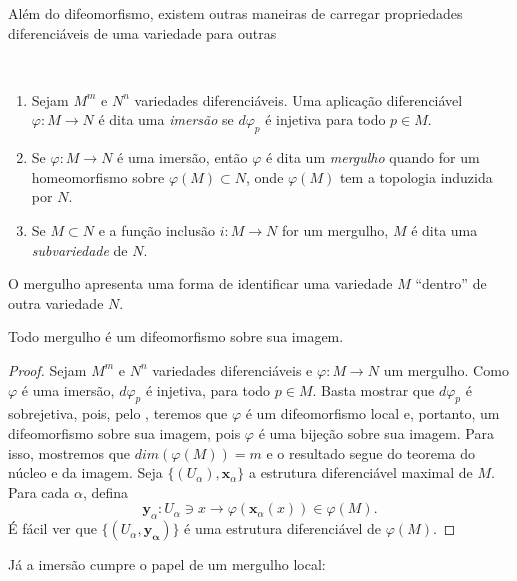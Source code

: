 	Além do difeomorfismo, existem outras maneiras de carregar propriedades diferenciáveis de uma variedade para outras
	\begin{definition}
		\label{def:imersao-mergulho}
		$ $
		\begin{enumerate}[label=(\roman*)]
			\item Sejam $M^m$ e $N^{n}$ variedades diferenciáveis. Uma aplicação diferenciável $\varphi:M\to N$ é dita uma \emph{imersão} se $d\varphi_{p}$ é injetiva para todo $p \in M$.
			\item Se $\varphi:M\to N$  é uma imersão, então $\varphi$ é dita um \emph{mergulho} quando for um homeomorfismo sobre $\varphi(M)\subset N$, onde $\varphi(M)$ tem a topologia induzida por $N$.
			\item Se $M \subset N$ e a função inclusão $i:M\to N$ for um mergulho, $M$ é dita uma \emph{subvariedade} de $N$.
		\end{enumerate}
	\end{definition}
	O mergulho apresenta uma forma de identificar uma variedade $M$ ``dentro'' de outra variedade $N$.
	\begin{proposition}
		\label{prop:imersao-mergulho}
		Todo mergulho é um difeomorfismo sobre sua imagem.
		\begin{proof}

			Sejam $M^{m}$ e $N^{n}$ variedades diferenciáveis e $\varphi:M\to N$ um mergulho.
			Como $\varphi$ é uma imersão, $d\varphi_{p}$ é injetiva, para todo $p \in M$.
			Basta mostrar que $d\varphi_{p}$ é sobrejetiva, pois, pelo , teremos que $\varphi$ é um difeomorfismo local e, portanto, um difeomorfismo sobre sua imagem, pois $\varphi$ é uma bijeção sobre sua imagem.
			Para isso, mostremos que $dim(\varphi(M)) = m$ e o resultado segue do teorema do núcleo e da imagem.
			Seja $\{ (U_{\alpha}), \mathbf{x}_{\alpha} \}$ a estrutura diferenciável maximal de $M$. Para cada $\alpha$, defina
			\begin{equation*}
				\mathbf{y}_{\alpha}:U_{\alpha} \ni x \longrightarrow \varphi(\mathbf{x}_{\alpha}(x)) \in \varphi(M).
			\end{equation*}
			É fácil ver que $\{ (U_{\alpha},\mathbf{y_{\alpha}}) \}$ é uma estrutura diferenciável de $\varphi(M)$.
		\end{proof}
	\end{proposition}
	Já a imersão cumpre o papel de um mergulho local:
